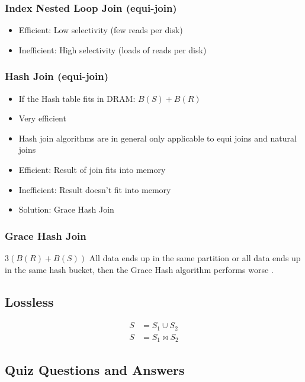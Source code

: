 \documentclass{article}
\begin{document}
\subsubsection{Index Nested Loop Join (equi-join)}

\begin{itemize}
    \item Efficient: Low selectivity (few reads per disk)
    \item Inefficient: High selectivity (loads of reads per disk)
\end{itemize}

\subsubsection{Hash Join (equi-join)}

\begin{itemize}
    \item If the Hash table fits in DRAM: \(B(S) + B(R)\)
    \item Very efficient
    \item Hash join algorithms are in general only applicable to equi joins and natural
          joins
    \item Efficient: Result of join fits into memory
    \item Inefficient: Result doesn't fit into memory
    \item Solution: Grace Hash Join
\end{itemize}

\subsubsection{Grace Hash Join}

\(3(B(R) + B(S))\)
All data ends up in the same partition or all data ends up in the same hash bucket, then the Grace Hash algorithm performs worse \cite{database-lecture}.

\subsection{Lossless}

\begin{align*}
    S & = S_1 \cup S_2    \\
    S & = S_1 \bowtie S_2
\end{align*}

\subsection{Quiz Questions and Answers}
\end{document}
